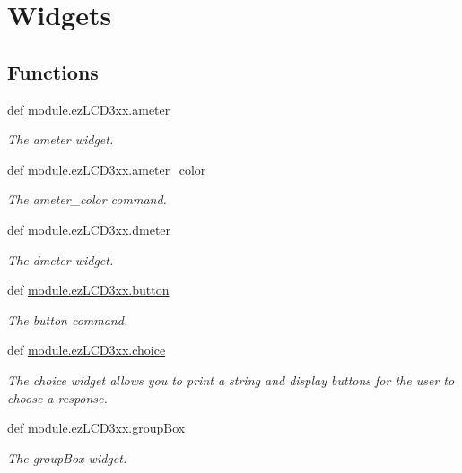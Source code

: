 \hypertarget{group___widgets}{\section{Widgets}
\label{group___widgets}
}
\subsection*{Functions}
\begin{DoxyCompactItemize}
\item 
def \hyperlink{group___widgets_ga437287c80e84027b6b9bebfe31764202}{module.\-ez\-L\-C\-D3xx.\-ameter}
\begin{DoxyCompactList}\small\item\em The ameter widget. \end{DoxyCompactList}\item 
def \hyperlink{group___widgets_gabe969d0e420d69f79a659f115e810acd}{module.\-ez\-L\-C\-D3xx.\-ameter\-\_\-color}
\begin{DoxyCompactList}\small\item\em The ameter\-\_\-color command. \end{DoxyCompactList}\item 
def \hyperlink{group___widgets_gae047f70bd7485eafe1e352282cf3c999}{module.\-ez\-L\-C\-D3xx.\-dmeter}
\begin{DoxyCompactList}\small\item\em The dmeter widget. \end{DoxyCompactList}\item 
def \hyperlink{group___widgets_ga6ce046794cbbfa9236c745b712fd2d6d}{module.\-ez\-L\-C\-D3xx.\-button}
\begin{DoxyCompactList}\small\item\em The button command. \end{DoxyCompactList}\item 
def \hyperlink{group___widgets_gaae5f45e0ca7c8a0294c75b786d728992}{module.\-ez\-L\-C\-D3xx.\-choice}
\begin{DoxyCompactList}\small\item\em The choice widget allows you to print a string and display buttons for the user to choose a response. \end{DoxyCompactList}\item 
def \hyperlink{group___widgets_ga189db08deeaf2ff69fad7e7e3612fe5b}{module.\-ez\-L\-C\-D3xx.\-group\-Box}
\begin{DoxyCompactList}\small\item\em The group\-Box widget. \end{DoxyCompactList}\item 

\end{DoxyCompactItemize}
